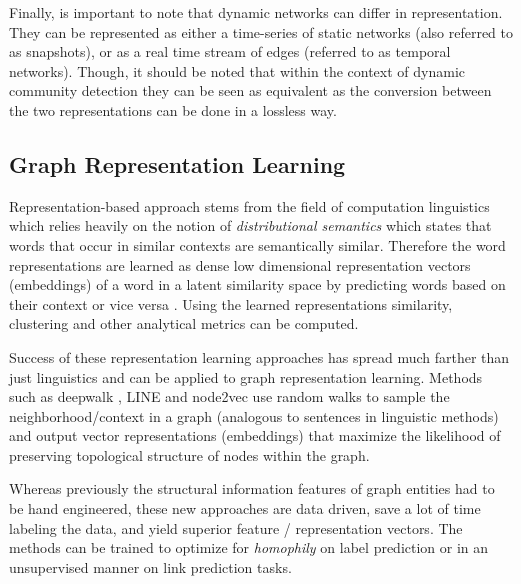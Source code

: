 \documentclass[
acmsmall,
nonacm,
screen,
acmthm]{../../scripts/pandoc/templates/acmart}
\begin{document}
Finally, is important to note that dynamic networks can differ in
representation. They can be represented as either a time-series of
static networks (also referred to as snapshots), or as a real time
stream of edges (referred to as temporal networks). Though, it should be
noted that within the context of dynamic community detection they can be
seen as equivalent as the conversion between the two representations can
be done in a lossless way.

\hypertarget{graph-representation-learning}{%
\subsection{Graph Representation
Learning}\label{graph-representation-learning}}

Representation-based approach stems from the field of computation
linguistics which relies heavily on the notion of \emph{distributional
semantics} which states that words that occur in similar contexts are
semantically similar. Therefore the word representations are learned as
dense low dimensional representation vectors (embeddings) of a word in a
latent similarity space by predicting words based on their context or
vice versa
\citep{mikolovEfficientEstimationWord2013, penningtonGloveGlobalVectors2014}.
Using the learned representations similarity, clustering and other
analytical metrics can be computed.

Success of these representation learning approaches has spread much
farther than just linguistics and can be applied to graph representation
learning. Methods such as deepwalk
\citep{perozziDeepWalkOnlineLearning2014}, LINE
\citep{tangLINELargescaleInformation2015} and node2vec
\citep{groverNode2vecScalableFeature2016} use random walks to sample the
neighborhood/context in a graph (analogous to sentences in linguistic
methods) and output vector representations (embeddings) that maximize
the likelihood of preserving topological structure of nodes within the
graph.

Whereas previously the structural information features of graph entities
had to be hand engineered, these new approaches are data driven, save a
lot of time labeling the data, and yield superior feature /
representation vectors. The methods can be trained to optimize for
\emph{homophily} on label prediction or in an unsupervised manner on
link prediction tasks.
\end{document}
